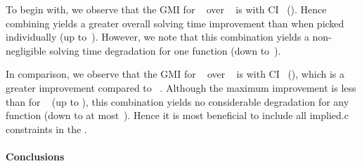 To begin with, we observe that the \gls{GMI} for ~ over ~ is \printGMI{%
  \SolvTechEnableOnlyGoodImpliedConsPrePlusSolvingTimeSpeedupPrePlusSolvingTimeRegularSpeedupGmean%
} with \gls{CI}~\printGMICI{%
  \SolvTechEnableOnlyGoodImpliedConsPrePlusSolvingTimeSpeedupPrePlusSolvingTimeRegularSpeedupCiMin%
}{%
  \SolvTechEnableOnlyGoodImpliedConsPrePlusSolvingTimeSpeedupPrePlusSolvingTimeRegularSpeedupCiMax%
} ().
%
Hence combining  yields a greater overall solving time
improvement than when picked individually (up
to~\printZCNorm{%
  \SolvTechEnableOnlyGoodImpliedConsPrePlusSolvingTimeSpeedupPrePlusSolvingTimeZeroCenteredSpeedupMax%
}).
%
However, we note that this combination yields a non-negligible solving time
degradation for one \gls{function} (down
to~\printZCNorm{%
  \SolvTechEnableOnlyGoodImpliedConsPrePlusSolvingTimeSpeedupPrePlusSolvingTimeZeroCenteredSpeedupMin%
}).

In comparison, we observe that the \gls{GMI} for ~ over ~ is \printGMI{%
  \SolvTechDisableAllImpliedConsPrePlusSolvingTimeSpeedupPrePlusSolvingTimeRegularSpeedupGmean%
} with \gls{CI}~\printGMICI{%
  \SolvTechDisableAllImpliedConsPrePlusSolvingTimeSpeedupPrePlusSolvingTimeRegularSpeedupCiMin%
}{%
  \SolvTechDisableAllImpliedConsPrePlusSolvingTimeSpeedupPrePlusSolvingTimeRegularSpeedupCiMax%
} (), which is a greater
improvement compared to ~.
%
Although the maximum improvement is less than for ~ (up to
\printZCNorm{%
  \SolvTechDisableAllImpliedConsPrePlusSolvingTimeSpeedupPrePlusSolvingTimeZeroCenteredSpeedupMax%
}), this combination yields no considerable degradation for any \gls{function}
(down to at
most~\printZCNorm{%
  \SolvTechDisableAllImpliedConsPrePlusSolvingTimeSpeedupPrePlusSolvingTimeZeroCenteredSpeedupMin%
}).
%
Hence it is most beneficial to include all \gls{implied.c} \glspl{constraint} in
the .


\paragraph{Conclusions}

